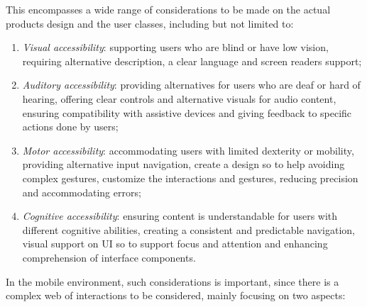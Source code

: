 This encompasses a wide range of considerations to be made on the actual products design and the user classes, including but not limited to:
\begin{enumerate}
    \item \textit{Visual accessibility}: supporting users who are blind or have low vision, requiring alternative description, a clear language and screen readers support;

    \item \textit{Auditory accessibility}: providing alternatives for users who are deaf or hard of hearing, offering clear controls and alternative  visuals for audio content, ensuring compatibility with assistive devices and giving feedback to specific actions done by users;

    \item \textit{Motor accessibility}: accommodating users with limited dexterity or mobility, providing alternative input navigation, create a design so to help avoiding complex gestures, customize the interactions and gestures, reducing precision and accommodating errors;

    \item \textit{Cognitive accessibility}: ensuring content is understandable for users with different cognitive abilities, creating a consistent and predictable navigation, visual support on UI so to support focus and attention and enhancing comprehension of interface components.
    
\end{enumerate}

In the mobile environment, such considerations is important, since there is a complex web of interactions to be considered, mainly focusing on two aspects:


